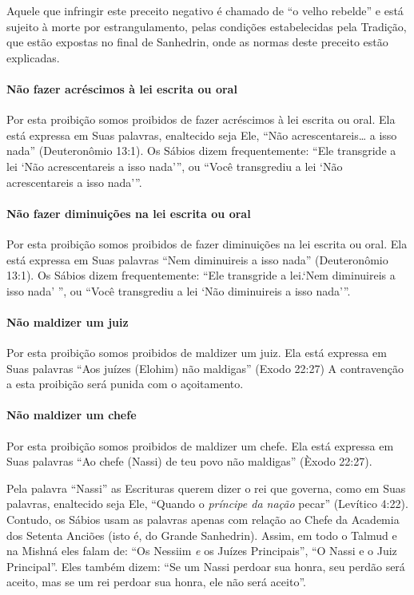 Aquele que infringir este preceito negativo é chamado de ``o velho
rebelde'' e está sujeito à morte por estrangulamento, pelas condições
estabelecidas pela Tradição, que estão expostas no final de Sanhedrin,
onde as normas deste preceito estão explicadas.

\paragraph{Não fazer acréscimos à lei escrita ou oral}

Por esta proibição somos proibidos de fazer acréscimos à lei escrita ou
oral. Ela está expressa em Suas palavras, enaltecido seja Ele, ``Não
acrescentareis\ldots{} a isso nada'' (Deuteronômio 13:1). Os Sábios dizem
frequentemente: ``Ele transgride a lei `Não acrescentareis a isso
nada''', ou ``Você transgrediu a lei `Não acrescentareis a isso nada'''.

\paragraph{Não fazer diminuições na lei escrita ou oral}

Por esta proibição somos proibidos de fazer diminuições na lei escrita
ou oral. Ela está expressa em Suas palavras ``Nem diminuireis a isso
nada'' (Deuteronômio 13:1). Os Sábios dizem frequentemente: ``Ele
transgride a lei.`Nem diminuireis a isso nada' '', ou ``Você transgrediu
a lei `Não diminuireis a isso nada'''.

\paragraph{Não maldizer um juiz}

Por esta proibição somos proibidos de maldizer um juiz. Ela está
expressa em Suas palavras ``Aos juízes (Elohim) não maldigas'' (Exodo
22:27) A contravenção a esta proibição será punida com o açoitamento.

\paragraph{Não maldizer um chefe}

Por esta proibição somos proibidos de maldizer um chefe. Ela está
expressa em Suas palavras ``Ao chefe (Nassi) de teu povo não maldigas''
(Èxodo 22:27).

Pela palavra ``Nassi'' as Escrituras querem dizer o
rei que governa, como em Suas palavras, enaltecido seja Ele, ``Quando o
\emph{príncipe da nação} pecar'' (Levítico 4:22). Contudo, os Sábios
usam as palavras apenas com relação ao Chefe da Academia dos Setenta
Anciões (isto é, do Grande Sanhedrin). Assim, em todo o Talmud e na
Mishná eles falam de: ``Os Nessiim \emph{e} os Juízes Principais'', ``O
Nassi e o Juiz Principal''. Eles também dizem: ``Se um Nassi perdoar
sua honra, seu perdão será aceito, mas se um rei perdoar sua honra, ele
não será aceito''.


